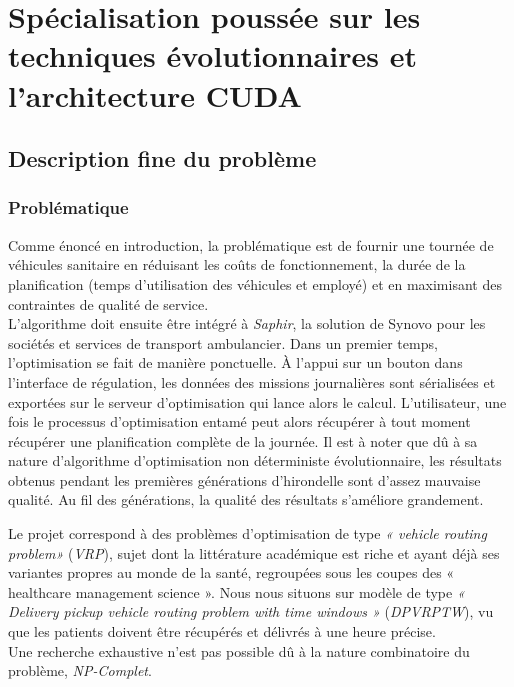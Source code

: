\documentclass[french, 11pt]{memoir}
\begin{document}
\section{Spécialisation poussée sur les techniques évolutionnaires et
	l'architecture
	CUDA}\label{spuxe9cialisation-poussuxe9e-sur-les-techniques-uxe9volutionnaires-et-larchitecture-cuda}

\subsection{Description fine du
	problème}\label{description-fine-du-probluxe8me}

\subsubsection{Problématique}\label{probluxe9matique}

Comme énoncé en introduction, la problématique est de fournir une
tournée de véhicules sanitaire en réduisant les coûts de fonctionnement,
la durée de la planification (temps d'utilisation des véhicules et
employé) et en maximisant des contraintes de qualité de
service. \\
L'algorithme doit ensuite être intégré à \emph{Saphir}, la
	solution de Synovo pour les sociétés et services de transport
	ambulancier. Dans un premier temps, l'optimisation se fait de manière
	ponctuelle. À l'appui sur un bouton dans l'interface de régulation, les
	données des missions journalières sont sérialisées et exportées sur le
	serveur d'optimisation qui lance alors le calcul. L'utilisateur, une
	fois le processus d'optimisation entamé peut alors récupérer à tout
	moment récupérer une planification complète de la journée. Il est à
	noter que dû à sa nature d'algorithme d'optimisation non déterministe
	évolutionnaire, les résultats obtenus pendant les premières générations
	d'hirondelle sont d'assez mauvaise qualité. Au fil des générations, la
	qualité des résultats s'améliore grandement.

\bigskip	
 Le projet correspond à des
	problèmes d'optimisation de type \emph{« vehicle routing problem»}
	(\emph{VRP}), sujet dont la littérature académique est riche et ayant
	déjà ses variantes propres au monde de la santé, regroupées sous les
	coupes des « healthcare management science ». Nous nous situons sur
	modèle de type \textit{« Delivery pickup vehicle routing problem with time
windows »} (\emph{DPVRPTW}), vu que les patients doivent être récupérés
et délivrés à une heure précise. \\
Une recherche exhaustive n'est pas possible dû à la nature combinatoire
du problème, \textit{NP-Complet}.
\end{document}
